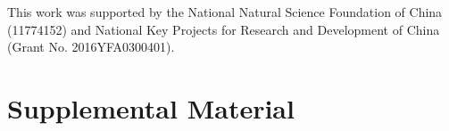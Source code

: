 \documentclass[amsmath,superscriptaddress,showpacs,aps,prl,twocolumn]{revtex4-1}
\begin{document}
\begin{acknowledgments}
\par This work was supported by the National Natural Science Foundation of China (11774152) and National Key Projects for Research and Development of China (Grant No. 2016YFA0300401).
\end{acknowledgments}



\widetext
\newpage
\appendix
\section{Supplemental Material}

\setcounter{equation}{0}
\setcounter{figure}{0}
\setcounter{table}{0}
\setcounter{section}{0}
\renewcommand{\theequation}{S\arabic{equation}}
\renewcommand{\thesection}{S\arabic{section}}
\renewcommand{\thetable}{S\arabic{table}}
\renewcommand{\thefigure}{S\arabic{figure}}
\end{document}
